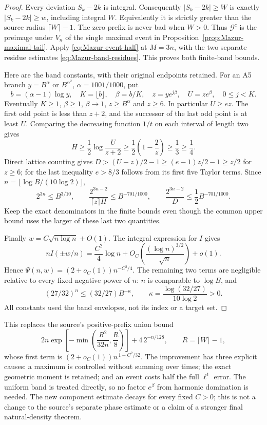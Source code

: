 \begin{proof}
Every deviation $S_k-2k$ is integral. Consequently
$|S_k-2k|\ge W$ is exactly $|S_k-2k|\ge w$, including integral $W$.
Equivalently it is strictly greater than the source radius
$\lceil W\rceil-1$. The zero prefix is never bad when $W>0$.
Thus $\mathcal G^c$ is the preimage under $V_n$ of the single
maximal event in Proposition~\ref{prop:Mazur-maximal-tail}.
Apply \eqref{eq:Mazur-event-half} at $M=3n$, with the two separate
residue estimates \eqref{eq:Mazur-band-residues}. This proves both
finite-band bounds.

Here are the band constants, with their original endpoints retained.
For an A5 branch $y=B^\alpha$ or $B^{\alpha^2}$,
$\alpha=1001/1000$, put
\[
 b=(\alpha-1)\log y,\quad K=\lfloor b\rfloor,\quad
 \beta=b/K,\quad z=y e^{j\beta},\quad U=z e^\beta,\quad 0\le j<K.
\]
Eventually $K\ge1$, $\beta\ge1$, $\beta\to1$, $z\ge B^\alpha$
and $z\ge6$. In particular $U\ge ez$.
The first odd point is less than $z+2$, and the successor of the
last odd point is at least $U$. Comparing the decreasing function
$1/t$ on each interval of length two gives
\[
 H\ge\frac12\log\frac{U}{z+2}
 \ge\frac12\left(1-\frac2z\right)\ge\frac13\ge\frac14.
\]
Direct lattice counting gives
$D>(U-z)/2-1\ge(e-1)z/2-1\ge z/2$ for $z\ge6$;
for the last inequality $e>8/3$ follows from its first five
Taylor terms. Since $n=\lfloor\log B/(10\log2)\rfloor$,
\[
 2^{3n}\le B^{3/10},\qquad
 \frac{2^{3n-2}}{\lceil z\rceil H}\le B^{-701/1000},\qquad
 \frac{2^{3n-2}}D\le\frac12 B^{-701/1000}.
\]
Keep the exact denominators in the finite bounds even though the
common upper bound uses the larger of these last two quantities.

Finally $w=C\sqrt{n\log n}+O(1)$. The integral expression for $I$ gives
\[
 nI(\pm w/n)=\frac{C^2}{4}\log n
   +O_C\!\left(\frac{(\log n)^{3/2}}{\sqrt n}\right)+o(1).
\]
Hence $\Psi(n,w)=(2+o_C(1))n^{-C^2/4}$.
The remaining two terms are negligible relative to every fixed
negative power of $n$: $n$ is comparable to $\log B$, and
\[
 (27/32)^n\le(32/27)B^{-\kappa},\qquad
 \kappa=\frac{\log(32/27)}{10\log2}>0.
\]
All constants used the band envelopes, not its index or a target set.
\end{proof}

This replaces the source's positive-prefix union bound
\[
 2n\exp\left[-\min\left(\frac{R^2}{32n},\frac R8\right)\right]
       +4\,2^{-n/128},\qquad R=\lceil W\rceil-1,
\]
whose first term is $(2+o_C(1))n^{\,1-C^2/32}$.
The improvement has three explicit causes: a maximum is controlled
without summing over times; the exact geometric moment is retained;
and an event costs half the full $\ell^1$ error.
The uniform band is treated directly, so no factor $e^\beta$ from
harmonic domination is needed. The new component estimate decays
for every fixed $C>0$; this is not a change to the source's separate
phase estimate or a claim of a stronger final natural-density theorem.

